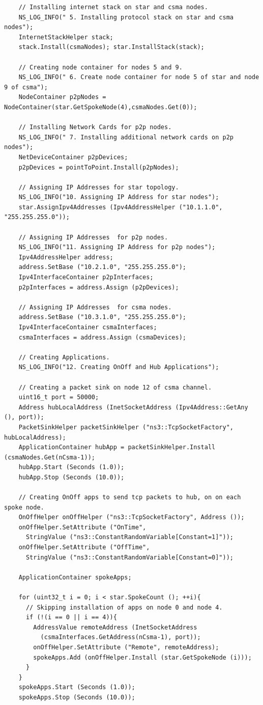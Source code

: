 \documentclass[fullpage]{article}
\begin{document}
\begin{verbatim}
    // Installing internet stack on star and csma nodes.
    NS_LOG_INFO(" 5. Installing protocol stack on star and csma nodes");
    InternetStackHelper stack;
    stack.Install(csmaNodes); star.InstallStack(stack);

    // Creating node container for nodes 5 and 9.
    NS_LOG_INFO(" 6. Create node container for node 5 of star and node 9 of csma");
    NodeContainer p2pNodes = NodeContainer(star.GetSpokeNode(4),csmaNodes.Get(0));

    // Installing Network Cards for p2p nodes.
    NS_LOG_INFO(" 7. Installing additional network cards on p2p nodes");
    NetDeviceContainer p2pDevices;
    p2pDevices = pointToPoint.Install(p2pNodes);

    // Assigning IP Addresses for star topology.
    NS_LOG_INFO("10. Assigning IP Address for star nodes");
    star.AssignIpv4Addresses (Ipv4AddressHelper ("10.1.1.0", "255.255.255.0"));

    // Assigning IP Addresses  for p2p nodes.
    NS_LOG_INFO("11. Assigning IP Address for p2p nodes");
    Ipv4AddressHelper address;
    address.SetBase ("10.2.1.0", "255.255.255.0");
    Ipv4InterfaceContainer p2pInterfaces;
    p2pInterfaces = address.Assign (p2pDevices);

    // Assigning IP Addresses  for csma nodes.
    address.SetBase ("10.3.1.0", "255.255.255.0");
    Ipv4InterfaceContainer csmaInterfaces;
    csmaInterfaces = address.Assign (csmaDevices);

    // Creating Applications.
    NS_LOG_INFO("12. Creating OnOff and Hub Applications");

    // Creating a packet sink on node 12 of csma channel.
    uint16_t port = 50000;
    Address hubLocalAddress (InetSocketAddress (Ipv4Address::GetAny (), port));
    PacketSinkHelper packetSinkHelper ("ns3::TcpSocketFactory", hubLocalAddress);
    ApplicationContainer hubApp = packetSinkHelper.Install (csmaNodes.Get(nCsma-1));
    hubApp.Start (Seconds (1.0));
    hubApp.Stop (Seconds (10.0));

    // Creating OnOff apps to send tcp packets to hub, on on each spoke node.
    OnOffHelper onOffHelper ("ns3::TcpSocketFactory", Address ());
    onOffHelper.SetAttribute ("OnTime",
      StringValue ("ns3::ConstantRandomVariable[Constant=1]"));
    onOffHelper.SetAttribute ("OffTime",
      StringValue ("ns3::ConstantRandomVariable[Constant=0]"));

    ApplicationContainer spokeApps;

    for (uint32_t i = 0; i < star.SpokeCount (); ++i){
      // Skipping installation of apps on node 0 and node 4.
      if (!(i == 0 || i == 4)){
        AddressValue remoteAddress (InetSocketAddress
          (csmaInterfaces.GetAddress(nCsma-1), port));
        onOffHelper.SetAttribute ("Remote", remoteAddress);
        spokeApps.Add (onOffHelper.Install (star.GetSpokeNode (i)));
      }
    }
    spokeApps.Start (Seconds (1.0));
    spokeApps.Stop (Seconds (10.0));


\end{verbatim}
\end{document}

